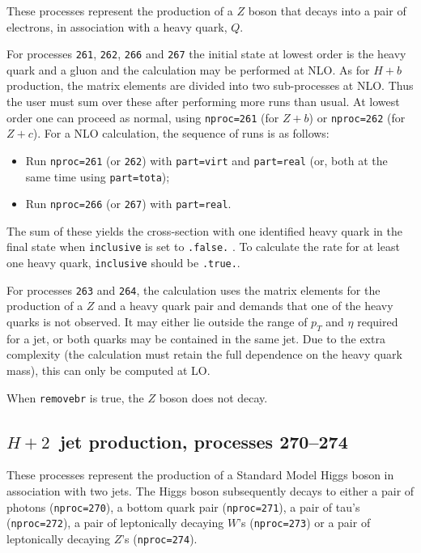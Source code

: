 \documentclass{article}
\begin{document}
{{{{{{These processes represent the production of a $Z$
boson that decays into a pair of electrons,
in association with a heavy quark, $Q$.

For processes {\tt 261}, {\tt 262}, {\tt 266} and {\tt 267} the initial
state at lowest order is the heavy quark and a gluon and 
the calculation may be performed at NLO.
As for $H+b$ production, the matrix elements are divided into two
sub-processes at NLO. Thus the user must sum over these after performing
more runs than usual. At lowest order one can proceed as normal, using
{\tt nproc=261} (for $Z+b$) or {\tt nproc=262} (for $Z+c$).
For a NLO calculation, the sequence of runs is as follows:
\begin{itemize}
\item Run {\tt nproc=261} (or {\tt 262}) with {\tt part=virt} and
{\tt part=real} (or, both at the same time using {\tt part=tota});
\item Run {\tt nproc=266} (or {\tt 267}) with {\tt part=real}.
\end{itemize}
The sum of these yields the cross-section with one identified heavy quark in
the final state when {\tt inclusive} is set to {\tt .false.} . To calculate the
rate for at least one heavy quark, {\tt inclusive} should be {\tt .true.}.

For processes {\tt 263} and
{\tt 264}, the calculation uses the matrix elements for the production
of a $Z$ and a heavy quark pair and demands that one of the heavy quarks
is not observed. It may either lie outside the range of $p_T$ and $\eta$
required for a jet, or both quarks may be contained in the same jet.
Due to the extra complexity (the calculation must retain the full
dependence on the heavy quark mass), this can only be computed at LO.

When {\tt removebr} is true, the $Z$ boson does not decay.

\subsection{$H + 2$~jet production, processes 270--274}

These processes represent the production of a Standard Model Higgs boson
in association with two jets. The Higgs boson
subsequently decays to either a pair of photons ({\tt nproc=270}), a bottom quark pair ({\tt nproc=271}), 
a pair of tau's ({\tt nproc=272}), a pair of leptonically decaying $W$'s ({\tt nproc=273}) 
or a pair of leptonically decaying $Z$'s ({\tt nproc=274}).

}}}}}}
\end{document}
